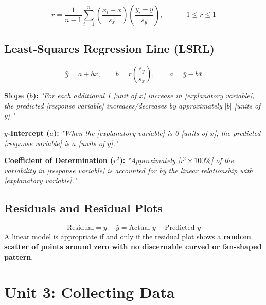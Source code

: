 \documentclass[11pt,oneside,openany]{book}
\begin{document}
\begin{equation}
  r = \frac{1}{n-1}\sum_{i=1}^n \left(\frac{x_i - \bar{x}}{s_x}\right)\left(\frac{y_i - \bar{y}}{s_y}\right), \qquad -1 \le r \le 1
\end{equation}

\section{Least-Squares Regression Line (LSRL)}
\begin{equation}
  \hat{y} = a + bx, \qquad b = r\left(\frac{s_y}{s_x}\right), \qquad a = \bar{y} - b\bar{x}
\end{equation}

\begin{frqrubricbox}
\textbf{Slope ($b$):} \textit{"For each additional 1 [unit of $x$] increase in [explanatory variable], the predicted [response variable] increases/decreases by approximately $|b|$ [units of $y$]."}

\textbf{$y$-Intercept ($a$):} \textit{"When the [explanatory variable] is 0 [units of $x$], the predicted [response variable] is $a$ [units of $y$]."}

\textbf{Coefficient of Determination ($r^2$):} \textit{"Approximately [r$^2 \times 100\%$] of the variability in [response variable] is accounted for by the linear relationship with [explanatory variable]."}
\end{frqrubricbox}

\section{Residuals and Residual Plots}
\begin{equation}
  \text{Residual} = y - \hat{y} = \text{Actual } y - \text{Predicted } y
\end{equation}
A linear model is appropriate if and only if the residual plot shows a \textbf{random scatter of points around zero with no discernable curved or fan-shaped pattern}.

\chapter{Unit 3: Collecting Data}
\end{document}
